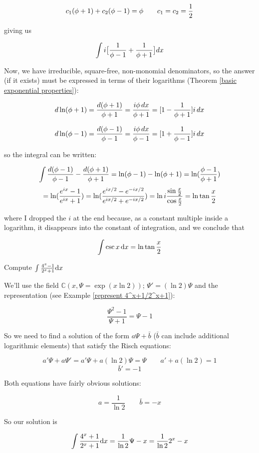 $${{c_1}(\phi+1)} + {{c_2}(\phi-1)} = \phi \qquad c_1 = c_2 = {1\over2} $$

giving us

$$\int i \big[ {{1}\over{\phi-1}} + {{1}\over{\phi+1}} \big] dx$$

Now, we have irreducible, square-free, non-monomial denominators, so
the answer (if it exists) must be expressed in terms of their
logarithms (Theorem \ref{basic exponential properties}):

$$ d \ln(\phi+1) = {{d(\phi+1)}\over{\phi+1}} = {{i\phi\,dx}\over{\phi+1}} = [1 - {{1}\over{\phi+1}}]i\,dx$$

$$ d \ln(\phi-1) = {{d(\phi-1)}\over{\phi-1}} = {{i\phi\,dx}\over{\phi-1}} = [1 + {{1}\over{\phi-1}}]i\,dx$$

so the integral can be written:

$$\int {{d(\phi-1)}\over{\phi-1}} - {{d(\phi+1)}\over{\phi+1}} = \ln (\phi-1) - \ln(\phi+1) = \ln({{\phi-1}\over{\phi+1}})$$
$$ = \ln ({{e^{ix}-1}\over{e^{ix}+1}}) = \ln ({{e^{ix/2}-e^{-ix/2}}\over{e^{ix/2}+e^{-ix/2}}}) = \ln i {{\sin {x\over2}}\over{\cos {x\over2}}} = \ln \tan {x\over2} $$

where I dropped the $i$ at the end because, as a constant multiple
inside a logarithm, it disappears into the constant of integration,
and we conclude that

$$\int \csc x \,{\rm d}x = \ln \tan {x\over2} $$

\endexample

\vfil\eject

\example Compute $\int {{4^x-1}\over{2^x+1}} {\rm d}x$
\label{integrate 4^x-1/2^x+1}

We'll use the field ${\mathbb C}(x,\Psi = \exp(x \ln 2))$; $\Psi' =
(\ln 2)\Psi$ and the representation (see Example
\ref{represent 4^x+1/2^x+1}):

$$ \frac{\Psi^2-1}{\Psi+1} = \Psi-1$$

So we need to find a solution of the form $a\Psi + \bar{b}$ ($\bar{b}$
can include additional logarithmic elements) that satisfy the Risch
equations:

$$a'\Psi + a\Psi' = a'\Psi + a(\ln 2)\Psi = \Psi \qquad a' + a(\ln 2) = 1$$
$$\bar{b}' = -1$$

Both equations have fairly obvious solutions:

$$a = \frac{1}{\ln 2} \qquad \bar{b}=-x$$

So our solution is

$$\int {{4^x+1}\over{2^x+1}} {\rm d}x = \frac{1}{\ln 2}\Psi - x =
\frac{1}{\ln 2}2^x - x$$

